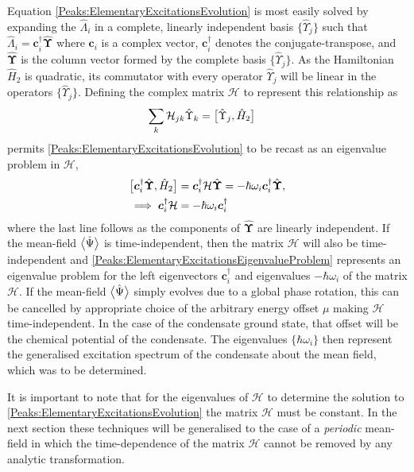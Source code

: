 Equation \eqref{Peaks:ElementaryExcitationsEvolution} is most easily solved by expanding the $\hat{\Lambda}_i$ in a complete, linearly independent basis $\{\hat{\Upsilon}_j\}$ such that $\hat{\Lambda}_i = \bm{c}_i^\dagger \hat{\bm{\Upsilon}}$ where $\bm{c}_i$ is a complex vector, $\bm{c}_i^\dagger$ denotes the conjugate-transpose, and $\hat{\bm{\Upsilon}}$ is the column vector formed by the complete basis $\{\hat{\Upsilon}_j\}$. As the Hamiltonian $\hat{H}_2$ is quadratic, its commutator with every operator $\hat{\Upsilon}_j$ will be linear in the operators $\{\hat{\Upsilon}_j\}$. Defining the complex matrix $\mathcal{H}$ to represent this relationship as
\begin{align}
    \label{Peaks:ScriptHRelationshipToHamiltonian}
    \sum_k \mathcal{H}_{jk} \hat{\Upsilon}_k &= \comm{\hat{\Upsilon}_j, \hat{H}_2}
\end{align}
permits \eqref{Peaks:ElementaryExcitationsEvolution} to be recast as an eigenvalue problem in $\mathcal{H}$,
\begin{align}
    \comm{\bm{c}_i^\dagger \hat{\bm{\Upsilon}}, \hat{H}_2} &= \bm{c}_i^\dagger \mathcal{H} \hat{\bm{\Upsilon}} = - \hbar \omega_i \bm{c}_i^\dagger \hat{\bm{\Upsilon}}, \label{Peaks:ElementaryExcitationsEigenvalueProblemWithOperators}\\
    \implies \bm{c}_i^\dagger \mathcal{H} &= - \hbar \omega_i \bm{c}_i^\dagger \label{Peaks:ElementaryExcitationsEigenvalueProblem}
\end{align}
where the last line follows as the components of $\hat{\bm{\Upsilon}}$ are linearly independent. If the mean-field ${\big<\hat{\Psi}\big>}$ is time-independent, then the matrix $\mathcal{H}$ will also be time-independent and \eqref{Peaks:ElementaryExcitationsEigenvalueProblem} represents an eigenvalue problem for the left eigenvectors $\bm{c}_i^\dagger$ and eigenvalues $-\hbar \omega_i$ of the matrix $\mathcal{H}$. If the mean-field ${\big<\hat{\Psi}\big>}$ simply evolves due to a global phase rotation, this can be cancelled by appropriate choice of the arbitrary energy offset $\mu$ making $\mathcal{H}$ time-independent.  In the case of the condensate ground state, that offset will be the chemical potential of the condensate. The eigenvalues $\{\hbar \omega_i\}$ then represent the generalised excitation spectrum of the condensate about the mean field, which was to be determined. 

It is important to note that for the eigenvalues of $\mathcal{H}$ to determine the solution to \eqref{Peaks:ElementaryExcitationsEvolution} the matrix $\mathcal{H}$ must be constant. In the next section these techniques will be generalised to the case of a \emph{periodic} mean-field in which the time-dependence of the matrix $\mathcal{H}$ cannot be removed by any analytic transformation.

